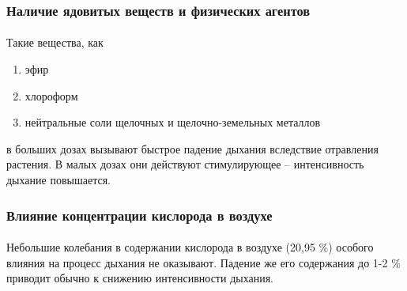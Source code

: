\subsubsection*{Наличие ядовитых веществ и физических агентов}

\paragraph*{}Такие вещества, как 

\begin{enumerate}

\item эфир
\item хлороформ 
\item нейтральные соли щелочных и щелочно-земельных металлов

\end{enumerate}
 
в больших дозах вызывают быстрое падение дыхания вследствие отравления растения. В малых дозах они действуют стимулирующее -- интенсивность дыхание повышается.

\subsubsection*{Влияние концентрации кислорода в воздухе}

\paragraph*{}Небольшие колебания в содержании кислорода в воздухе (20,95 \%) особого влияния на процесс дыхания не оказывают. Падение же его содержания до 1-2 \% приводит обычно к снижению интенсивности дыхания. 



 
